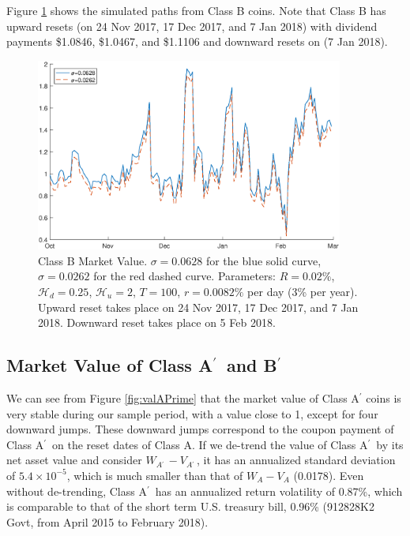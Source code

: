 \documentclass[11pt]{article}%
\numberwithin{equation}{section}
\theoremstyle{plain}
\newcommand{\Ap}{A\ensuremath{^\prime}~}
\newcommand{\Bp}{B\ensuremath{^\prime}~}
\begin{document}
Figure \ref{fig:valB} shows the simulated paths from Class B coins. Note that Class B has upward resets (on 24 Nov 2017, 17 Dec 2017, and 7 Jan 2018) with dividend payments \$1.0846, \$1.0467, and \$1.1106 and downward resets on (7 Jan 2018).


\begin{figure}[!htb]
\begin{centering}
\includegraphics[width=0.9\textwidth]{WB}
\par\end{centering}
\caption{Class B Market Value. $\sigma = 0.0628$ for the blue solid curve, $\sigma=0.0262$ for the red dashed curve. Parameters: $R=0.02\%$, $\mathcal{H}_{d}=0.25$, $\mathcal{H}_{u} =2$, $T=100$, $r=0.0082\%$ per day (3\% per year). Upward reset takes place on 24 Nov 2017, 17 Dec 2017, and 7 Jan 2018. Downward reset takes place on 5 Feb 2018.}
\label{fig:valB}
\end{figure}


\subsection{\texorpdfstring{Market Value of Class \Ap and \Bp}{Lg}}

We can see from Figure \ref{fig:valAPrime} that the market value of Class A$^\prime$ coins is very stable during our sample period, with a value close to 1, except for four downward jumps. These downward jumps correspond to the coupon payment of Class \Ap on the reset dates of Class A. If we de-trend the value of Class \Ap by its net asset value and consider $W_{\Ap}-V_{\Ap}$, it has an annualized standard deviation of $5.4\times 10^{-5}$, which is much smaller than that of $W_{A}-V_{A}$ (0.0178). Even without de-trending, Class \Ap has an annualized return volatility of 0.87\%, which is comparable to that of the short term U.S. treasury bill, 0.96\% (912828K2 Govt, from April 2015 to February 2018).
\end{document}

